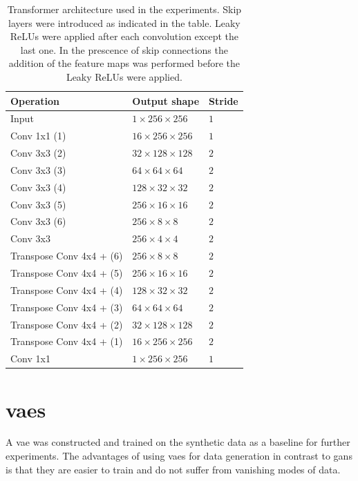 \begin{table}[t]
    \centering
    \caption{Transformer architecture used in the experiments. Skip layers were introduced as indicated in the table. Leaky ReLUs were applied after each convolution except the last one. In the prescence of skip connections the addition of the feature maps was performed before the Leaky ReLUs were applied.}
    \label{tab:transformer}
    \begin{tabular}{|lll|}
        \hline
        Operation           & Output shape  & Stride \\ \hline
        Input               & $1\times256\times256$     &$1$    \\
        Conv 1x1 (1)           & $16\times256\times256$    &$1$    \\
        Conv 3x3 (2)            & $32\times128\times128$    &$2$    \\    
        Conv 3x3 (3)           & $64\times64\times64$    &$2$    \\ 
        Conv 3x3 (4)           & $128\times32\times32$    &$2$   \\ 
        Conv 3x3 (5)           & $256\times16\times16$    &$2$   \\ 
        Conv 3x3 (6)           & $256\times8\times8$     &$2$   \\ 
        Conv 3x3            & $256\times4\times4$    &$2$   \\ \hline
        Transpose Conv 4x4 + (6)  & $256\times8\times8$    &$2$   \\
        Transpose Conv 4x4 + (5) & $256\times16\times16$    &$2$   \\
        Transpose Conv 4x4 + (4) & $128\times32\times32$    &$2$   \\
        Transpose Conv 4x4 + (3) & $64\times64\times64$    &$2$   \\
        Transpose Conv 4x4 + (2) & $32\times128\times128$    &$2$   \\
        Transpose Conv 4x4 + (1)  & $16\times256\times256$    &$2$   \\
        Conv 1x1            & $1\times256\times256$    &$1$    \\ \hline
    \end{tabular}
\end{table}

\section{\acrlong{vaes}}
A \acrlong{vae} was constructed and trained on the synthetic data as a baseline for further experiments. The advantages of using \acrshort{vaes} for data generation in contrast to \acrshort{gans} is that they are easier to train and do not suffer from vanishing modes of data.

